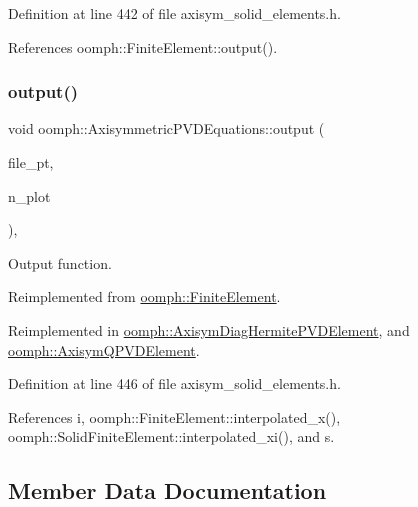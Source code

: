 Definition at line 442 of file axisym\+\_\+solid\+\_\+elements.\+h.



References oomph\+::\+Finite\+Element\+::output().

\mbox{\label{classoomph_1_1AxisymmetricPVDEquations_a780e6e426869eec81758bf7396a54bad}} 
\subsubsection{\texorpdfstring{output()}{output()}\hspace{0.1cm}{\footnotesize\ttfamily [4/4]}}
{\footnotesize\ttfamily void oomph\+::\+Axisymmetric\+P\+V\+D\+Equations\+::output (\begin{DoxyParamCaption}\item[{F\+I\+LE $\ast$}]{file\+\_\+pt,  }\item[{const unsigned \&}]{n\+\_\+plot }\end{DoxyParamCaption})\hspace{0.3cm}{\ttfamily [inline]}, {\ttfamily [virtual]}}



Output function. 



Reimplemented from \hyperlink{classoomph_1_1FiniteElement_adfaee690bb0608f03320eeb9d110d48c}{oomph\+::\+Finite\+Element}.



Reimplemented in \hyperlink{classoomph_1_1AxisymDiagHermitePVDElement_adb95d8bc9f3177ae6c49f62fe48a1902}{oomph\+::\+Axisym\+Diag\+Hermite\+P\+V\+D\+Element}, and \hyperlink{classoomph_1_1AxisymQPVDElement_afcd700bebcd0e1c83066da66804785c9}{oomph\+::\+Axisym\+Q\+P\+V\+D\+Element}.



Definition at line 446 of file axisym\+\_\+solid\+\_\+elements.\+h.



References i, oomph\+::\+Finite\+Element\+::interpolated\+\_\+x(), oomph\+::\+Solid\+Finite\+Element\+::interpolated\+\_\+xi(), and s.



\subsection{Member Data Documentation}
\mbox{\label{classoomph_1_1AxisymmetricPVDEquations_a69bc689b112a9b24de68315296ab9c87}} 
